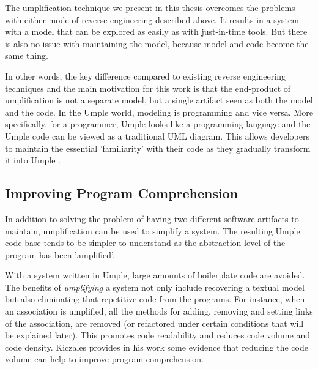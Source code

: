 The umplification technique we present in this thesis overcomes the problems with either mode of reverse engineering described above. It results in a system with a model that can be explored as easily as with just-in-time tools. But there is also no issue with maintaining the model, because model and code become the same thing.

In other words, the key difference compared to existing reverse engineering techniques and the main motivation for this work is that the end-product of umplification is not a separate model, but a single artifact seen as both the model and the code. In the Umple world, modeling is programming and vice versa. More specifically, for a programmer, Umple looks like a programming language and the Umple code can be viewed as a traditional UML diagram. This allows developers to maintain the essential 'familiarity' with their code as they gradually transform it into Umple \cite{Forward2008}. 

\subsection{Improving Program Comprehension}

In addition to solving the problem of having two different software artifacts to maintain,   umplification can be used to simplify a system. The resulting Umple code base tends to be simpler to understand \cite{UmpleMAIN} as the abstraction level of the program has been 'amplified'.

With a system written in Umple, large amounts of boilerplate code are avoided. The benefits of \textit{umplifying} a system not only include recovering a textual model but also eliminating that repetitive code from the programs. For instance, when an association is umplified, all the methods for adding, removing and setting links of the association, are removed (or refactored under certain conditions that will be explained later). This promotes code readability and reduces code volume and code density. Kiczales provides in his work \cite{kiczalesAOP} some evidence that reducing the code volume can help to improve program comprehension.

